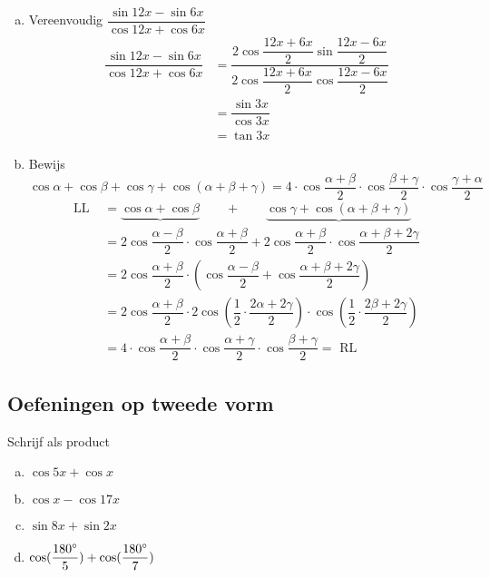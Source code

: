 \documentclass[a4paper,12pt]{article}
\begin{document}
\begin{theorie}
\begin{enumerate}[(a)]
  \item Vereenvoudig $\dfrac{\sin 12x - \sin 6x}{\cos 12x + \cos 6x}$
  \begin{align*}
    \dfrac{\sin 12x - \sin 6x}{\cos 12x + \cos 6x} &= \dfrac{2\cos \dfrac{12x + 6x}{2} \sin \dfrac{12x - 6x}{2}}{2\cos \dfrac{12x + 6x}{2} \cos \dfrac{12x - 6x}{2}}\\
                                                   &= \dfrac{\sin 3x}{\cos 3x}\\
                                                   &= \tan 3x
  \end{align*}
  \item Bewijs $\cos\alpha + \cos\beta + \cos\gamma + \cos(\alpha + \beta + \gamma)=4\cdot \cos\dfrac{\alpha+\beta}{2} \cdot \cos\dfrac{\beta+\gamma}{2} \cdot \cos\dfrac{\gamma+\alpha}{2}$
  \begin{align*}
    \mbox{LL } &= \underbrace{\cos\alpha + \cos\beta} \qquad + \qquad \underbrace{\cos\gamma + \cos(\alpha + \beta + \gamma)}\\
               &= 2 \cos\dfrac{\alpha-\beta}{2}\cdot\cos\dfrac{\alpha+\beta}{2}+2\cos\dfrac{\alpha+\beta}{2}\cdot\cos\dfrac{\alpha+\beta+2\gamma}{2}\\
               &= 2 \cos\dfrac{\alpha+\beta}{2}\cdot\left(\cos\dfrac{\alpha-\beta}{2} + \cos\dfrac{\alpha+\beta+2\gamma}{2}\right)\\
               &= 2 \cos\dfrac{\alpha+\beta}{2} \cdot 2 \cos\left(\dfrac{1}{2}\cdot\dfrac{2\alpha+2\gamma}{2}\right) \cdot \cos\left(\dfrac{1}{2}\cdot\dfrac{2\beta+2\gamma}{2}\right)\\
               &= 4\cdot \cos\dfrac{\alpha+\beta}{2} \cdot \cos\dfrac{\alpha+\gamma}{2} \cdot \cos\dfrac{\beta + \gamma}{2} = \mbox{ RL}
  \end{align*}
\end{enumerate}

\pagebreak
\subsection{Oefeningen op tweede vorm}

\end{theorie}

\begin{oefening}
Schrijf als product
\begin{enumerate}[(a)]
\itemsep.5em
  \item $\cos5x+\cos x$
  \item $\cos x-\cos17x$
  \item $\sin8x+\sin2x$
  \item $\cos(\dfrac{180^\circ}{5})+\cos(\dfrac{180^\circ}{7})$
\end{enumerate}
\end{oefening}
\end{document}
